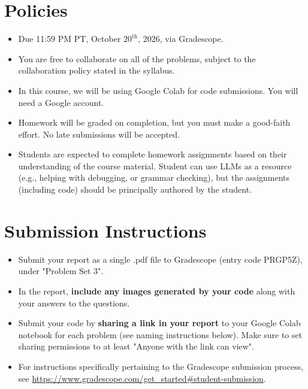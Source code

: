 \documentclass{article}
\begin{document}
\pagestyle{fancy}




\section*{Policies}
\begin{itemize}
	\item Due 11:59 PM PT, October $20^\text{th}$, 2026, via Gradescope.
	\item You are free to collaborate on all of the problems, subject to the collaboration policy stated in the syllabus.
	\item In this course, we will be using Google Colab for code submissions. You will need a Google account.
	\item Homework will be graded on completion, but you must make a good-faith effort. No late submissions will be accepted.
	\item Students are expected to complete homework assignments based on their understanding of the course material. Student can use LLMs as a resource (e.g., helping with debugging, or grammar checking), but the assignments (including code) should be principally authored by the student.
\end{itemize}

\section*{Submission Instructions}
\begin{itemize}
	\item Submit your report as a single .pdf file to Gradescope (entry code PRGP5Z), under "Problem Set 3".
	\item In the report, \textbf{include any images generated by your code} along with your answers to the questions.
	\item Submit your code by \textbf{sharing a link in your report} to your Google Colab notebook for each problem (see naming instructions below). Make sure to set sharing permissions to at least "Anyone with the link can view".
	\item For instructions specifically pertaining to the Gradescope submission process, see \url{https://www.gradescope.com/get_started#student-submission}.
\end{itemize}
\end{document}
